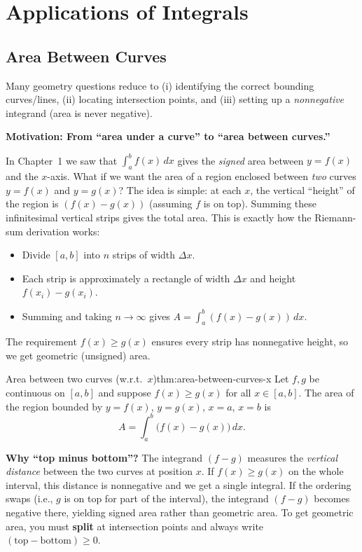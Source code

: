 
\newpage
\section{Applications of Integrals}

\subsection{Area Between Curves}

Many geometry questions reduce to (i) identifying the correct bounding curves/lines, (ii) locating intersection points, and (iii) setting up a \emph{nonnegative} integrand (area is never negative).

\textbf{Motivation: From ``area under a curve'' to ``area between curves.''}

In Chapter~1 we saw that $\int_a^b f(x)\,dx$ gives the \emph{signed} area between $y=f(x)$ and the $x$-axis. What if we want the area of a region enclosed between \emph{two} curves $y=f(x)$ and $y=g(x)$? The idea is simple: at each $x$, the vertical ``height'' of the region is $(f(x)-g(x))$ (assuming $f$ is on top). Summing these infinitesimal vertical strips gives the total area. This is exactly how the Riemann-sum derivation works:
\begin{itemize}[leftmargin=*]
\item Divide $[a,b]$ into $n$ strips of width $\Delta x$.
\item Each strip is approximately a rectangle of width $\Delta x$ and height $f(x_i)-g(x_i)$.
\item Summing and taking $n\to\infty$ gives $A=\int_a^b(f(x)-g(x))\,dx$.
\end{itemize}
The requirement $f(x)\ge g(x)$ ensures every strip has nonneg\-ative height, so we get geometric (unsigned) area.

\begin{theorem}{Area between two curves (w.r.t.\ $x$)}{thm:area-between-curves-x}
Let $f,g$ be continuous on $[a,b]$ and suppose $f(x)\ge g(x)$ for all $x\in[a,b]$.
The area of the region bounded by $y=f(x)$, $y=g(x)$, $x=a$, $x=b$ is
\[
A=\int_a^b \bigl(f(x)-g(x)\bigr)\,dx.
\]
\end{theorem}

\textbf{Why ``top minus bottom''?}
The integrand $(f-g)$ measures the \emph{vertical distance} between the two curves at position $x$. If $f(x)\ge g(x)$ on the whole interval, this distance is nonneg\-ative and we get a single integral. If the ordering swaps (i.e., $g$ is on top for part of the interval), the integrand $(f-g)$ becomes negative there, yielding signed area rather than geometric area. To get geometric area, you must \textbf{split} at intersection points and always write $(\text{top}-\text{bottom})\ge 0$.

